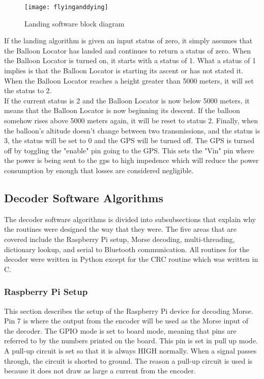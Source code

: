 \documentclass[12pt, letterpaper]{article}
\begin{document}
\begin{figure}[H]
    \centering
    \texttt{[image: flyinganddying]}
    \caption{Landing software block diagram}
    \label{Ass9001}
\end{figure}

If the landing algorithm is given an input status of zero, it simply assumes that the Balloon Locator has landed and continues to return a status of zero. When the Balloon Locator is turned on, it starts with a status of 1. What a status of 1 implies is that the Balloon Locator is starting its ascent or has not stated it. When the Balloon Locator reaches a height greater than 5000 meters, it will set the status to 2.\\

If the current status is 2 and the Balloon Locator is now below 5000 meters, it means that the Balloon Locator is now beginning its descent. If the balloon somehow rises above 5000 meters again, it will be reset to status 2. Finally, when the balloon's altitude doesn't change between two transmissions, and the status is 3, the status will be set to 0 and the GPS will be turned off. The GPS is turned off by toggling the "enable" pin going to the GPS. This sets the "Vin" pin where the power is being sent to the gps to high impedence which will reduce the power consumption by enough that losses are considered negligible.


\subsection{Decoder Software Algorithms}
The decoder software algorithms is divided into subsubsections that explain why the routines were designed the way that they were. The five areas that are covered include the Raspberry Pi setup, Morse decoding, multi-threading, dictionary lookup, and serial to Bluetooth communication. All routines for the decoder were written in Python except for the CRC routine which was written in C.

\subsubsection{Raspberry Pi Setup}
This section describes the setup of the Raspberry Pi device for decoding Morse. Pin 7 is where the output from the encoder will be used as the Morse input of the decoder. The GPIO mode is set to board mode, meaning that pins are referred to by the numbers printed on the board. This pin is set in pull up mode. A pull-up circuit is set so that it is always HIGH normally. When a signal passes through, the circuit is shorted to ground. The reason a pull-up circuit is used is because it does not draw as large a current from the encoder.
\end{document}
